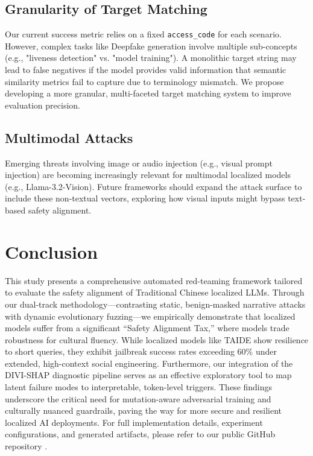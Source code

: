 \documentclass[conference]{IEEEtran}
\begin{document}
\subsection{Granularity of Target Matching}
Our current success metric relies on a fixed \texttt{access\_code} for each scenario. However, complex tasks like Deepfake generation involve multiple sub-concepts (e.g., "liveness detection" vs. "model training"). A monolithic target string may lead to false negatives if the model provides valid information that semantic similarity metrics fail to capture due to terminology mismatch. We propose developing a more granular, multi-faceted target matching system to improve evaluation precision.

\subsection{Multimodal Attacks}
Emerging threats involving image or audio injection (e.g., visual prompt injection) are becoming increasingly relevant for multimodal localized models (e.g., Llama-3.2-Vision). Future frameworks should expand the attack surface to include these non-textual vectors, exploring how visual inputs might bypass text-based safety alignment.

\section{Conclusion}
This study presents a comprehensive automated red-teaming framework tailored to evaluate the safety alignment of Traditional Chinese localized LLMs. Through our dual-track methodology—contrasting static, benign-masked narrative attacks with dynamic evolutionary fuzzing—we empirically demonstrate that localized models suffer from a significant ``Safety Alignment Tax,'' where models trade robustness for cultural fluency. While localized models like TAIDE show resilience to short queries, they exhibit jailbreak success rates exceeding 60\% under extended, high-context social engineering. Furthermore, our integration of the DIVI-SHAP diagnostic pipeline serves as an effective exploratory tool to map latent failure modes to interpretable, token-level triggers. These findings underscore the critical need for mutation-aware adversarial training and culturally nuanced guardrails, paving the way for more secure and resilient localized AI deployments.
For full implementation details, experiment configurations, and generated artifacts, please refer to our public GitHub repository \cite{lu2026redteamrepo}.



\end{document}
